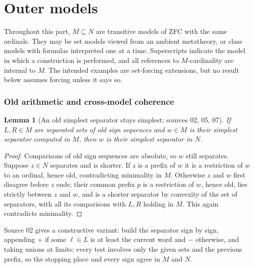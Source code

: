 \documentclass[11pt,letterpaper]{article}
\newtheorem{lemma}[lemma]{Lemma}\aliascntresetthe{lemma}
\theoremstyle{definition}
\theoremstyle{remark}
\begin{document}
\part{Outer models}\label{hset:part:outer}

Throughout this part, $M\subseteq N$ are transitive models of ZFC with the same
ordinals. They may be set models viewed from an ambient metatheory, or class
models with formulas interpreted one at a time. Superscripts indicate the model
in which a construction is performed, and all references to $M$-cardinality are
internal to $M$. The intended examples are set-forcing extensions, but no
result below assumes forcing unless it says so.

\section{Old arithmetic and cross-model coherence}
\label{hset:sec:absolute}\label{hset:sec:extensions}

\begin{lemma}[An old simplest separator stays simplest; sources 02, 05, 07]
\label{hset:lem:oldcuts}
If $L,R\in M$ are separated sets of old sign sequences and $w\in M$ is their
simplest separator computed in $M$, then $w$ is their simplest separator in
$N$.
\end{lemma}
\begin{proof}
Comparisons of old sign sequences are absolute, so $w$ still separates. Suppose
$z\in N$ separates and is shorter. If $z$ is a prefix of $w$ it is a restriction
of $w$ to an ordinal, hence old, contradicting minimality in $M$. Otherwise $z$
and $w$ first disagree before $z$ ends; their common prefix $p$ is a
restriction of $w$, hence old, lies strictly between $z$ and $w$, and is a
shorter separator by convexity of the set of separators, with all its
comparisons with $L,R$ holding in $M$. This again contradicts minimality.
\end{proof}

Source 02 gives a constructive variant: build the separator sign by sign,
appending $+$ if some $\ell\in L$ is at least the current word and $-$
otherwise, and taking unions at limits; every test involves only the given sets
and the previous prefix, so the stopping place and every sign agree in $M$ and
$N$.
\end{document}
